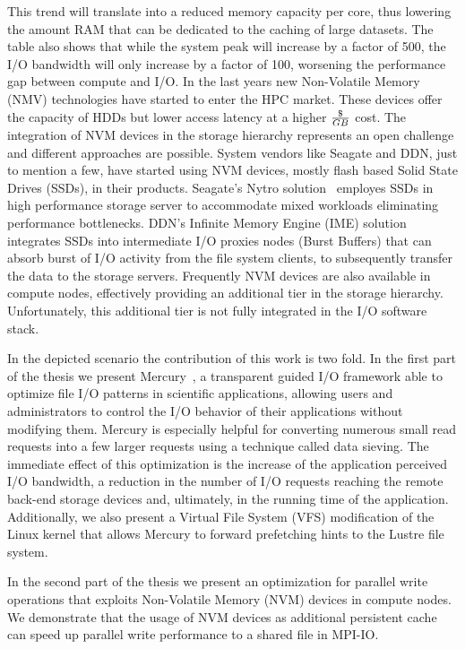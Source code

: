 This trend will translate into a reduced memory capacity per core, thus lowering the amount RAM that can be dedicated to the caching of large datasets. The table also shows that while the system peak will 
increase by a factor of 500, the I/O bandwidth will only increase by a factor of 100, worsening the performance gap between compute and I/O. In the last years new Non-Volatile Memory (NMV) technologies 
have started to enter the HPC market. These devices offer the capacity of HDDs but lower access latency at a higher $ \$ \over GB $ cost. The integration of NVM devices in the storage hierarchy represents an open challenge 
and different approaches are possible. System vendors like Seagate and DDN, just to mention a few, have started using NVM devices, mostly flash based Solid State Drives (SSDs), in their products. Seagate's Nytro 
solution~\cite{Nytro} employes SSDs in high performance storage server to accommodate mixed workloads eliminating performance bottlenecks. DDN's Infinite Memory Engine (IME) solution~\cite{IME} integrates SSDs 
into intermediate I/O proxies nodes (Burst Buffers) that can absorb burst of I/O activity from the file system clients, to subsequently transfer the data to the storage servers. Frequently NVM devices are also available 
in compute nodes, effectively providing an additional tier in the storage hierarchy. Unfortunately, this additional tier is not fully integrated in the I/O software stack.

In the depicted scenario the contribution of this work is two fold. In the first part of the thesis we present Mercury~\cite{CongiuGPMSB}, a transparent guided I/O framework able to optimize file I/O patterns in 
scientific applications, allowing users and administrators to control the I/O behavior of their applications without modifying them. Mercury is especially helpful for converting numerous small read requests into 
a few larger requests using a technique called data sieving. The immediate effect of this optimization is the increase of the application perceived I/O bandwidth, a reduction in the number of I/O requests reaching 
the remote back-end storage devices and, ultimately, in the running time of the application. Additionally, we also present a Virtual File System (VFS) modification of the Linux kernel that allows Mercury to forward 
prefetching hints to the Lustre file system.

In the second part of the thesis we present an optimization for parallel write operations that exploits Non-Volatile Memory (NVM) devices in compute nodes. We demonstrate that the usage of NVM devices as additional
persistent cache can speed up parallel write performance to a shared file in MPI-IO.

